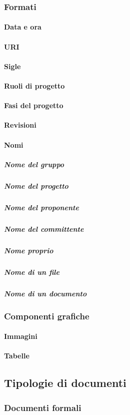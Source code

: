 \documentclass[../NormeProgetto.tex]{subfiles}
\begin{document}
		\subsubsection{Formati}
			\paragraph{Data e ora}
			\paragraph{URI}
			\paragraph{Sigle}
			\paragraph{Ruoli di progetto}
			\paragraph{Fasi del progetto}
			\paragraph{Revisioni}
			\paragraph{Nomi}
				\subparagraph{Nome del gruppo}
				\subparagraph{Nome del progetto}
				\subparagraph{Nome del proponente}
				\subparagraph{Nome del committente}
				\subparagraph{Nome proprio}
				\subparagraph{Nome di un file}
				\subparagraph{Nome di un documento}
		\subsubsection{Componenti grafiche}
			\paragraph{Immagini}
			\paragraph{Tabelle}
	\subsection{Tipologie di documenti}
		\subsubsection{Documenti formali}
\end{document}
